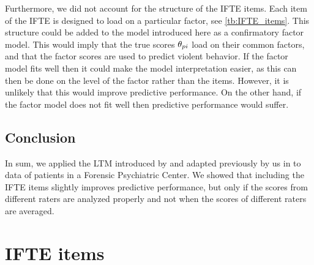 \documentclass[a4paper,11pt]{article}
\begin{document}
Furthermore, we did not account for the structure of the IFTE items.
Each item of the IFTE is designed to load on a particular factor, see \autoref{tb:IFTE_items}.
This structure could be added to the model introduced here as a confirmatory factor model.
This would imply that the true scores $\theta_{pi}$ load on their common factors, and that the factor scores are used to predict violent behavior.
If the factor model fits well then it could make the model interpretation easier, as this can then be done on the level of the factor rather than the items.
However, it is unlikely that this would improve predictive performance.
On the other hand, if the factor model does not fit well then predictive performance would suffer.

\subsection{Conclusion}
In sum, we applied the LTM introduced by \textcite{Anders2015cultural} and adapted previously by us in \textcite{vandenBergh2020cultural} to data of patients in a Forensic Psychiatric Center.
We showed that including the IFTE items slightly improves predictive performance, but only if the scores from different raters are analyzed properly and not when the scores of different raters are averaged.



\printbibliography
\newpage

\appendix

\section{IFTE items}
\end{document}
